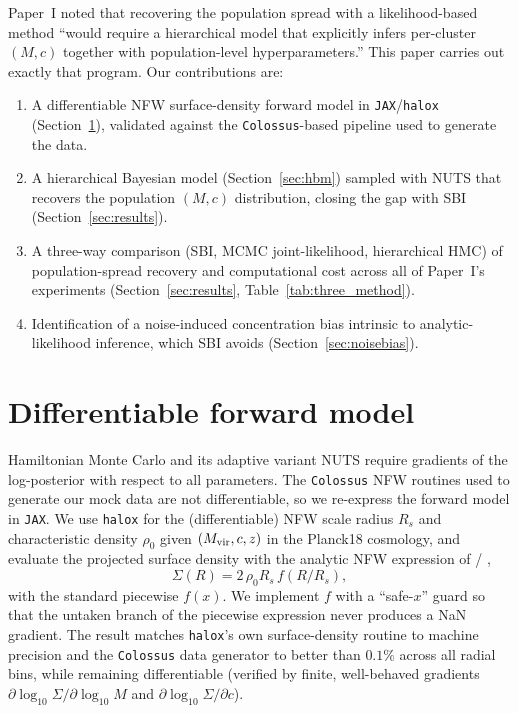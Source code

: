 \documentclass[11pt]{article}
\newcommand{\code}[1]{\texttt{#1}}
\begin{document}
Paper~I noted that recovering the population spread with a likelihood-based method ``would require
a hierarchical model that explicitly infers per-cluster $(M,c)$ together with population-level
hyperparameters.'' This paper carries out exactly that program. Our contributions are:
\begin{enumerate}
  \item A differentiable NFW surface-density forward model in \code{JAX}/\code{halox}
        (Section~\ref{sec:forward}), validated against the \code{Colossus}-based pipeline used to
        generate the data.
  \item A hierarchical Bayesian model (Section~\ref{sec:hbm}) sampled with NUTS that recovers the
        population $(M,c)$ distribution, closing the gap with SBI (Section~\ref{sec:results}).
  \item A three-way comparison (SBI, MCMC joint-likelihood, hierarchical HMC) of population-spread
        recovery and computational cost across all of Paper~I's experiments
        (Section~\ref{sec:results}, Table~\ref{tab:three_method}).
  \item Identification of a noise-induced concentration bias intrinsic to analytic-likelihood
        inference, which SBI avoids (Section~\ref{sec:noisebias}).
\end{enumerate}

\section{Differentiable forward model}
\label{sec:forward}

Hamiltonian Monte Carlo and its adaptive variant NUTS require gradients of the log-posterior with
respect to all parameters. The \code{Colossus} \citep{Colossus18} NFW routines used to generate our
mock data are not differentiable, so we re-express the forward model in \code{JAX}. We use
\code{halox} \citep{halox} for the (differentiable) NFW scale radius $R_s$ and characteristic
density $\rho_0$ given $(M_{\rm vir}, c, z)$ in the Planck18 cosmology, and evaluate the projected
surface density with the analytic NFW expression of \citet{Bartelmann1996} / \citet{WrightBrainerd2000},
\begin{equation}
  \Sigma(R) = 2\,\rho_0 R_s\, f(R/R_s),
\end{equation}
with the standard piecewise $f(x)$. We implement $f$ with a ``safe-$x$'' guard so that the
untaken branch of the piecewise expression never produces a NaN gradient. The result matches
\code{halox}'s own surface-density routine to machine precision and the \code{Colossus} data
generator to better than $0.1\%$ across all radial bins, while remaining differentiable
(verified by finite, well-behaved gradients $\partial \log_{10}\Sigma/\partial \log_{10}M$ and
$\partial \log_{10}\Sigma/\partial c$).
\end{document}
